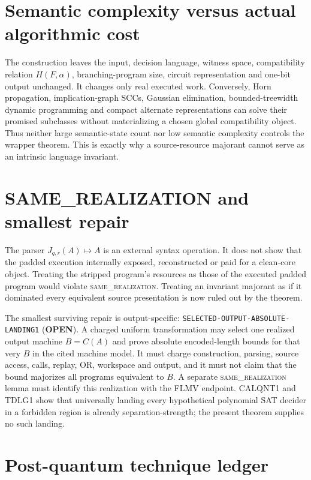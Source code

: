 \documentclass[11pt]{article}
\newcommand{\OPEN}{\textbf{OPEN}}
\newcommand{\same}{\textsc{same\_realization}}
\begin{document}
\section{Semantic complexity versus actual algorithmic cost}

The construction leaves the input, decision language, witness space,
compatibility relation $H(F,\alpha)$, branching-program size, circuit
representation and one-bit output unchanged.  It changes only real executed
work.  Conversely, Horn propagation, implication-graph SCCs, Gaussian
elimination, bounded-treewidth dynamic programming and compact alternate
representations can solve their promised subclasses without materializing a
chosen global compatibility object.  Thus neither large semantic-state count
nor low semantic complexity controls the wrapper theorem.  This is exactly why
a source-resource majorant cannot serve as an intrinsic language invariant.

\section{SAME\_REALIZATION and smallest repair}

The parser $J_{q,r}(A)\mapsto A$ is an external syntax operation.  It does not
show that the padded execution internally exposed, reconstructed or paid for a
clean-core object.  Treating the stripped program's resources as those of the
executed padded program would violate \same.  Treating an invariant majorant
as if it dominated every equivalent source presentation is now ruled out by
the theorem.

The smallest surviving repair is output-specific:
\texttt{SELECTED-OUTPUT-ABSOLUTE-LANDING1} (\OPEN).  A charged uniform
transformation may select one realized output machine $B=C(A)$ and prove
absolute encoded-length bounds for that very $B$ in the cited machine model.
It must charge construction, parsing, source access, calls, replay, OR,
workspace and output, and it must not claim that the bound majorizes all
programs equivalent to $B$.  A separate \same{} lemma must identify this
realization with the FLMV endpoint.  CALQNT1 and TDLG1 show that universally
landing every hypothetical polynomial SAT decider in a forbidden region is
already separation-strength; the present theorem supplies no such landing.

\section{Post-quantum technique ledger}
\end{document}
